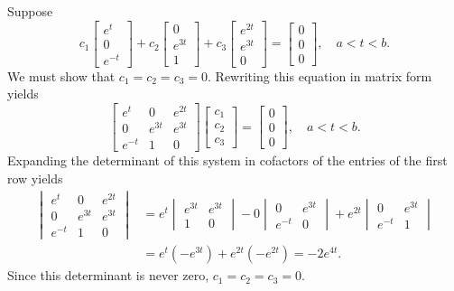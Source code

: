 \begin{solution}
Suppose
\[
c_1\begin{bmatrix}e^t\\0\\e^{-t}\end{bmatrix}+
c_2\begin{bmatrix}0\\e^{3t}\\1\end{bmatrix}+
c_3\begin{bmatrix}e^{2t}\\e^{3t}\\0\end{bmatrix}
=\begin{bmatrix}0\\0\\0\end{bmatrix},\quad a<t<b.
\]
We must show that $c_1=c_2=c_3=0$. Rewriting this equation in matrix
form yields
\[
\begin{bmatrix}e^t&0&e^{2t}\\0&e^{3t}&e^{3t}\\e^{-t}&1&0\end{bmatrix}
\begin{bmatrix}c_1\\c_2\\c_3\end{bmatrix}=
\begin{bmatrix}0\\0\\0\end{bmatrix},\quad a<t<b.
\]
Expanding the determinant of this system in cofactors of the entries
of the first row yields
\begin{align*}
\begin{vmatrix}e^t&0&e^{2t}\\0&e^{3t}&e^{3t}\\e^{-t}&1&0
\end{vmatrix}
&=e^t\begin{vmatrix}e^{3t}&e^{3t}\\1&0\end{vmatrix}
-0\begin{vmatrix}0&e^{3t}\\e^{-t}&0\end{vmatrix}
+e^{2t}\begin{vmatrix}0&e^{3t}\\e^{-t}&1\end{vmatrix} \\
&=e^t(-e^{3t})+e^{2t}(-e^{2t})=-2e^{4t}.
\end{align*}
Since this determinant is never zero,
$c_1=c_2=c_3=0$.
\end{solution}


